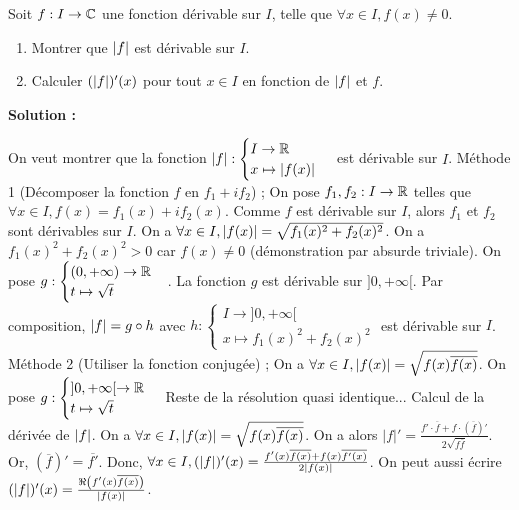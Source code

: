\documentclass[12pt, a4paper]{report}
\begin{document}
\begin{exercise}
    Soit $f : I\to \mathbb{C}$ une fonction dérivable sur $I$, telle que $\forall x \in I, f(x)\not=0$.

    \begin{enumerate}
        \item Montrer que $\left|f\right|$ est dérivable sur $I$.
        \item Calculer $(\left|f\right|)'(x)$ pour tout $x \in I$ en fonction de $\left|f\right|$ et $f$.
    \end{enumerate}

    \textbf{Solution :}

    \begin{outline}[enumerate]
        \1 On veut montrer que la fonction $\left|f\right| : \begin{cases} I \to \mathbb{R} \\ x \mapsto \left|f(x)\right| \end{cases}$ est dérivable sur $I$.
        \2 Méthode 1 (Décomposer la fonction $f$ en $f_1 + if_2$) ;
        \3 On pose $f_1, f_2 : I \to \mathbb{R}$ telles que $\forall x \in I, f(x) = f_1(x) + if_2(x)$.
        \3 Comme $f$ est dérivable sur $I$, alors $f_1$ et $f_2$ sont dérivables sur $I$.
        \3 On a $\forall x \in I, \left|f(x)\right| = \sqrt{f_1(x)^2 + f_2(x)^2}$.
        \3 On a $f_1(x)^2 + f_2(x)^2 > 0$ car $f(x) \neq 0$ (démonstration par absurde triviale).
        \3 On pose $g : \begin{cases} (0,+\infty) \to \mathbb{R} \\ t \mapsto \sqrt{t} \end{cases}$.
        \3 La fonction $g$ est dérivable sur $]0,+\infty[$.
        \3 Par composition, $\left|f\right| = g \circ h$ avec $h : \begin{cases} I \to ]0,+\infty[ \\ x \mapsto f_1(x)^2 + f_2(x)^2 \end{cases}$ est dérivable sur $I$.
        \2 Méthode 2 (Utiliser la fonction conjugée) ;
        \3 On a $\forall x \in I, \left|f(x)\right| = \sqrt{f(x)\overline{f(x)}}$.
        \3 On pose $g : \begin{cases} ]0,+\infty[ \to \mathbb{R} \\ t \mapsto \sqrt{t} \end{cases}$
        \3 Reste de la résolution quasi identique...
        \1 Calcul de la dérivée de $\left|f\right|$.
        \2 On a $\forall x \in I, \left|f(x)\right| = \sqrt{f(x)\overline{f(x)}}$.
        \2 On a alors $|f|'= \frac{f'\cdot\overline{f} + f\cdot(\overline{f})'}{2\sqrt{f\overline{f}}}$.
        \2 Or, $(\overline{f})' = \overline{f'}$.
        \2 Donc, $\forall x \in I, (\left|f\right|)'(x) = \frac{f'(x)\overline{f(x)} + f(x)\overline{f'(x)}}{2\left|f(x)\right|}$.
        \2 On peut aussi écrire $(\left|f\right|)'(x) = \frac{\Re\left(f'(x)\overline{f(x)}\right)}{\left|f(x)\right|}$.
    \end{outline}

\end{exercise}
\end{document}
